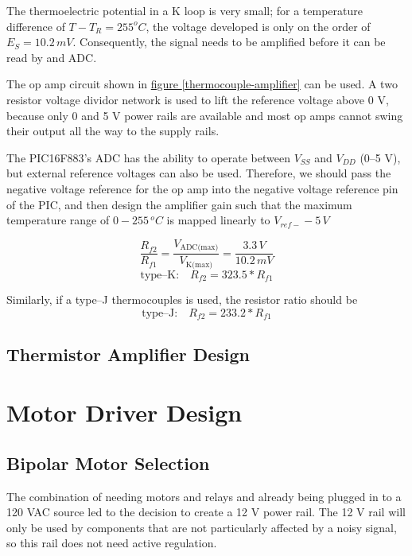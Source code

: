 \documentclass[10pt, twocolumn]{article}
\begin{document}
The thermoelectric potential in a K loop is very small; 
for a temperature difference of $T-T_{R}=255^{o}C$,
the voltage developed is only on the order of $E_{S}=10.2\,mV$.
Consequently, the signal needs to be amplified before it can be read by and ADC.

The op amp circuit shown in
\hyperref[thermocouple-amplifier]{figure \ref{thermocouple-amplifier}}
can be used. A two resistor voltage dividor network is used to lift the reference
voltage above 0 V, because only 0 and 5 V power rails are available and most
op amps cannot swing their output all the way to the supply rails.

The \textrm{PIC16F883}'s ADC has the ability to operate between $V_{SS}$ and $V_{DD}$ (0--5 V),
but external reference voltages can also be used. Therefore, we should pass the
negative voltage reference for the op amp into the negative voltage reference pin of the PIC,
and then design the amplifier gain such that the maximum temperature range of $0-255\,^{o}C$
is mapped linearly to $V_{ref-}-5\,V$

\begin{equation*}
	\frac{R_{f2}}{R_{f1}}=
	\frac{V_{\textrm{ADC(max)}}}{V_{\textrm{K(max)}}}=
	\frac{3.3\,V}{10.2\,mV}
\end{equation*}
\begin{equation}
\textrm{type--K:}\quad R_{f2}=323.5*R_{f1}
\end{equation}

Similarly, if a type--J thermocouples is used, the resistor ratio should be
\begin{equation}
\textrm{type--J:}\quad R_{f2}=233.2*R_{f1}
\end{equation}

\subsection{Thermistor Amplifier Design}

\section{Motor Driver Design}

\subsection{Bipolar Motor Selection}

The combination of needing motors and relays and already being plugged in to a 
120 VAC source led to the decision to create a 12 V power rail. The 12 V rail
will only be used by components that are not particularly affected by a noisy
signal, so this rail does not need active regulation.
\end{document}
